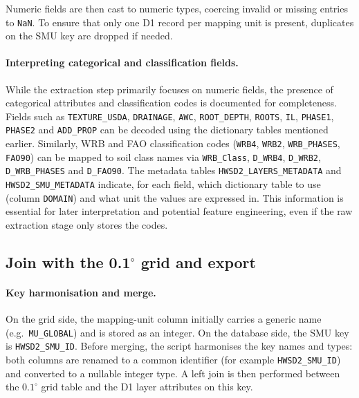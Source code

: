 Numeric fields are then cast to numeric types, coercing invalid or missing
entries to \texttt{NaN}. To ensure that only one D1 record per mapping unit is
present, duplicates on the SMU key are dropped if needed.

\paragraph{Interpreting categorical and classification fields.}

While the extraction step primarily focuses on numeric fields, the presence of
categorical attributes and classification codes is documented for completeness.
Fields such as \texttt{TEXTURE\_USDA}, \texttt{DRAINAGE}, \texttt{AWC},
\texttt{ROOT\_DEPTH}, \texttt{ROOTS}, \texttt{IL}, \texttt{PHASE1}, \texttt{PHASE2}
and \texttt{ADD\_PROP} can be decoded using the dictionary tables mentioned
earlier. Similarly, WRB and FAO classification codes (\texttt{WRB4}, \texttt{WRB2},
\texttt{WRB\_PHASES}, \texttt{FAO90}) can be mapped to soil class names via
\texttt{WRB\_Class}, \texttt{D\_WRB4}, \texttt{D\_WRB2}, \texttt{D\_WRB\_PHASES}
and \texttt{D\_FAO90}. The metadata tables
\texttt{HWSD2\_LAYERS\_METADATA} and \texttt{HWSD2\_SMU\_METADATA} indicate,
for each field, which dictionary table to use (column \texttt{DOMAIN}) and what
unit the values are expressed in. This information is essential for later
interpretation and potential feature engineering, even if the raw extraction
stage only stores the codes.

\subsection{Join with the 0.1\texorpdfstring{$^{\circ}$}{°} grid and export}

\paragraph{Key harmonisation and merge.}

On the grid side, the mapping-unit column initially carries a generic name
(e.g.\ \texttt{MU\_GLOBAL}) and is stored as an integer. On the database side,
the SMU key is \texttt{HWSD2\_SMU\_ID}. Before merging, the script harmonises
the key names and types: both columns are renamed to a common identifier (for
example \texttt{HWSD2\_SMU\_ID}) and converted to a nullable integer type. A
left join is then performed between the $0.1^{\circ}$ grid table and the D1
layer attributes on this key.

